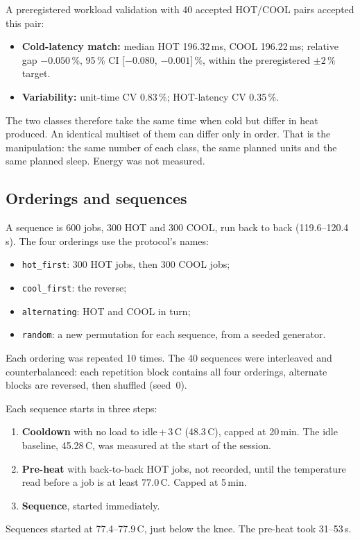 \documentclass[conference,a4paper]{IEEEtran}
\newcommand{\degC}{\,\textdegree{}C}
\newcommand{\code}[1]{\texttt{#1}}
\begin{document}
A preregistered workload validation with 40 accepted HOT/COOL pairs accepted this pair:
\begin{itemize}
\item \textbf{Cold-latency match:} median HOT 196.32\,ms, COOL 196.22\,ms; relative gap $-0.050$\,\%, 95\,\% CI
[$-0.080$, $-0.001$]\,\%, within the preregistered $\pm2$\,\% target.
\item \textbf{Variability:} unit-time CV 0.83\,\%; HOT-latency CV 0.35\,\%.
\end{itemize}
The two classes therefore take the same time when cold but differ in heat produced. An identical multiset of them
can differ only in order. That is the manipulation: the same number of each class, the same planned units and the
same planned sleep. Energy was not measured.

\subsection{Orderings and sequences}
A sequence is 600 jobs, 300 HOT and 300 COOL, run back to back (119.6--120.4\,s). The four orderings use the
protocol's names:
\begin{itemize}
\item \code{hot\_first}: 300 HOT jobs, then 300 COOL jobs;
\item \code{cool\_first}: the reverse;
\item \code{alternating}: HOT and COOL in turn;
\item \code{random}: a new permutation for each sequence, from a seeded generator.
\end{itemize}

Each ordering was repeated 10 times. The 40 sequences were interleaved and counterbalanced: each repetition block
contains all four orderings, alternate blocks are reversed, then shuffled (seed~0).

Each sequence starts in three steps:
\begin{enumerate}
\item \textbf{Cooldown} with no load to idle\,+\,3\degC{} (48.3\degC{}), capped at 20\,min. The idle baseline,
45.28\degC{}, was measured at the start of the session.
\item \textbf{Pre-heat} with back-to-back HOT jobs, not recorded, until the temperature read before a job is at
least 77.0\degC{}. Capped at 5\,min.
\item \textbf{Sequence}, started immediately.
\end{enumerate}
Sequences started at 77.4--77.9\degC{}, just below the knee. The pre-heat took 31--53\,s.
\end{document}
